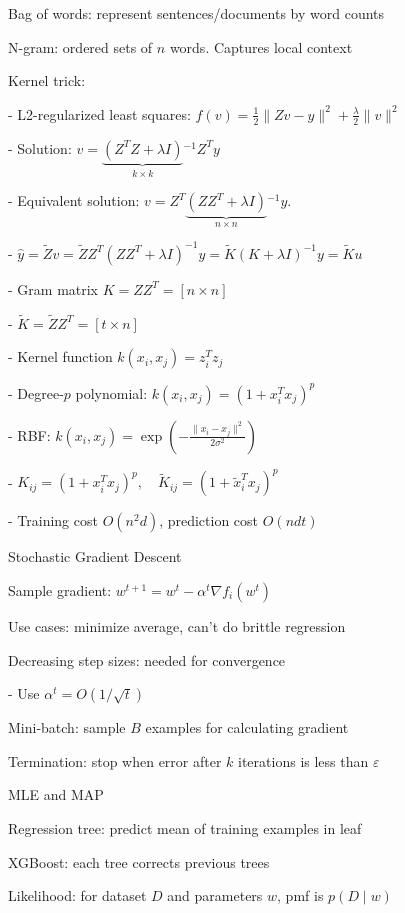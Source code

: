 \documentclass[10pt]{article}
\makeatletter
\renewcommand{\section}{\@startsection{section}{1}{0ex}{-1ex}{0.7ex}
                        {\normalfont\normalsize\bfseries}}
\newcommand{\norm}[1]{\lVert #1 \rVert}
\newcommand{\ep}{\varepsilon}
\makeatother
\begin{document}
\begin{multicols*}{3}
Bag of words: represent sentences/documents by word counts

N-gram: ordered sets of $n$ words. Captures local context

Kernel trick: 

- L2-regularized least squares: $f(v)=\frac 12\norm{Zv-y}^2+\frac\lambda 2\norm v^2$

- Solution: $v=\underbrace{(Z^TZ+\lambda I)}_{k\times k}{^{-1}}Z^Ty$

- Equivalent solution: $v=Z^T\underbrace{(ZZ^T+\lambda I)}_{n\times n}{^{-1}}y$. 

- $\hat y=\tilde Zv=\tilde ZZ^T(ZZ^T+\lambda I)^{-1}y=\tilde K(K+\lambda I)^{-1}y=\tilde Ku$

- Gram matrix $K=ZZ^T=[n\times n]$

- $\tilde K=\tilde ZZ^T=[t\times n]$

- Kernel function $k(x_i,x_j)=z_i^Tz_j$

- Degree-$p$ polynomial: $k(x_i,x_j)=(1+x_i^Tx_j)^p$

- RBF: $k(x_i,x_j)=\exp(-\frac{\norm{x_i-x_j}^2}{2\sigma^2})$

- $K_{ij}=(1+x_i^Tx_j)^p,\quad\tilde K_{ij}=(1+\tilde x_i^Tx_j)^p$

- Training cost $O(n^2d)$, prediction cost $O(ndt)$

\section{Stochastic Gradient Descent}

Sample gradient: $w^{t+1}=w^t-\alpha^t\nabla f_i(w^t)$

Use cases: minimize average, can't do brittle regression

Decreasing step sizes: needed for convergence

- Use $\alpha^t=O(1/\sqrt t)$

Mini-batch: sample $B$ examples for calculating gradient

Termination: stop when error after $k$ iterations is less than $\ep$

\section{MLE and MAP}

Regression tree: predict mean of training examples in leaf

XGBoost: each tree corrects previous trees

Likelihood: for dataset $D$ and parameters $w$, pmf is $p(D\mid w)$


\end{multicols*}
\end{document}
